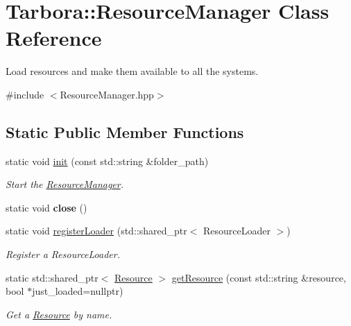 \hypertarget{classTarbora_1_1ResourceManager}{}\section{Tarbora\+:\+:Resource\+Manager Class Reference}
\label{classTarbora_1_1ResourceManager}


Load resources and make them available to all the systems.  




{\ttfamily \#include $<$Resource\+Manager.\+hpp$>$}

\subsection*{Static Public Member Functions}
\begin{DoxyCompactItemize}
\item 
static void \hyperlink{classTarbora_1_1ResourceManager_a83f6083aa9a2c8331a0fd519b7d9f62d}{init} (const std\+::string \&folder\+\_\+path)
\begin{DoxyCompactList}\small\item\em Start the \hyperlink{classTarbora_1_1ResourceManager}{Resource\+Manager}. \end{DoxyCompactList}\item 
\mbox{\label{classTarbora_1_1ResourceManager_ad1338ebabf7eea681140d78749789204}} 
static void {\bfseries close} ()
\item 
static void \hyperlink{classTarbora_1_1ResourceManager_a16851fa61eb7b4c3db0d079ddb295080}{register\+Loader} (std\+::shared\+\_\+ptr$<$ Resource\+Loader $>$)
\begin{DoxyCompactList}\small\item\em Register a {\itshape Resource\+Loader}. \end{DoxyCompactList}\item 
static std\+::shared\+\_\+ptr$<$ \hyperlink{classTarbora_1_1Resource}{Resource} $>$ \hyperlink{classTarbora_1_1ResourceManager_a2c160dc338dfbfecc0b6f7d5a5da981e}{get\+Resource} (const std\+::string \&resource, bool $\ast$just\+\_\+loaded=nullptr)
\begin{DoxyCompactList}\small\item\em Get a \hyperlink{classTarbora_1_1Resource}{Resource} by name. \end{DoxyCompactList}\item 

\end{DoxyCompactItemize}
